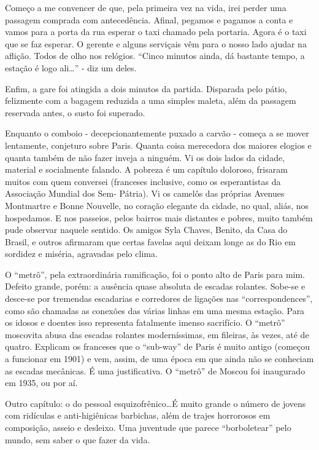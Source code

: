 Começo a me convencer de que, pela primeira vez na vida, irei perder uma passagem comprada com antecedência. Afinal, pegamos e pagamos a conta e vamos para a porta da rua esperar o taxi chamado pela portaria. Agora é o taxi que se faz esperar. O gerente e alguns serviçais vêm para o nosso lado ajudar na aflição. Todos de olho nos relógios. “Cinco minutos ainda, dá bastante tempo, a estação é logo ali\ldots” - diz um deles.

Enfim, a gare foi atingida a dois minutos da partida. Disparada pelo pátio, felizmente com a bagagem reduzida a uma simples maleta, além da passagem reservada antes, o susto foi superado.

Enquanto o comboio - decepcionantemente puxado a carvão - começa a se mover lentamente, conjeturo sobre Paris. Quanta coisa merecedora dos maiores elogios e quanta também de não fazer inveja a ninguém. Vi os dois lados da cidade, material e socialmente falando. A pobreza é um capítulo doloroso, frisaram muitos com quem conversei (franceses inclusive, como os esperantistas da Associação Mundial dos Sem- Pátria). Vi os camelôs das próprias Avenues Montmartre e Bonne Nouvelle, no coração elegante da cidade, no qual, aliás, nos hospedamos. E nos passeios, pelos bairros mais distantes e pobres, muito também pude observar naquele sentido. Os amigos Syla Chaves, Benito, da Casa do Brasil, e outros afirmaram que certas favelas aqui deixam longe as do Rio em sordidez e miséria, agravadas pelo clima.

O “metrô”, pela extraordinária ramificação, foi o ponto alto de Paris para mim. Defeito grande, porém: a ausência quase absoluta de escadas rolantes. Sobe-se e desce-se por tremendas escadarias e corredores de ligações nas “correspondences”, como são chamadas as conexões das várias linhas em uma mesma estação. Para os idosos e doentes isso representa fatalmente imenso sacrifício. O “metrô” moscovita abusa das escadas rolantes moderníssimas, em fileiras, às vezes, até de quatro. Explicam os franceses que o “sub-way” de Paris é muito antigo (começou a funcionar em 1901) e vem, assim, de uma época em que ainda não se conheciam as escadas mecânicas. É uma justificativa. O “metrô” de Moscou foi inaugurado em 1935, ou por aí.

Outro capítulo: o do pessoal esquizofrênico\ldots É muito grande o número de jovens com ridículas e anti-higiênicas barbichas, além de trajes horrorosos em composição, asseio e desleixo. Uma juventude que parece “borboletear” pelo mundo, sem saber o que fazer da vida.

